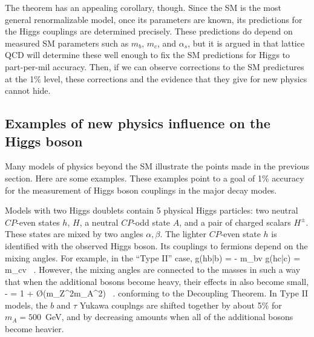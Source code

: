 The theorem has an appealing corollary, though.   Since the SM is the most general renormalizable model, once its parameters are known, its predictions for the Higgs couplings are determined precisely.   These predictions do depend on measured SM parameters such as $m_b$, $m_c$, and $\alpha_s$, but  it is argued in \cite{Lepage:2014fla} that  
lattice QCD will determine these well enough to fix the SM predictions for Higgs to part-per-mil accuracy.   Then, if we can observe corrections to the SM predictures at the 1\% level, these corrections and the evidence that they give for new physics cannot hide.

\subsection{Examples of  new physics influence on the Higgs boson}

Many models of physics beyond the SM illustrate the points made in the previous section. Here are some examples.   These examples point to  a goal of 1\% accuracy
for the measurement of Higgs boson couplings in the major decay modes.

Models with two Higgs doublets contain 5 physical Higgs particles: two  neutral $CP$-even states $h$, $H$,  a neutral $CP$-odd state $A$, and a pair of charged scalars $H^\pm$.  These states are mixed by two angles $\alpha, \beta$. The lighter
$CP$-even state $h$ is identified with the observed Higgs boson.  Its couplings to 
fermions depend on the mixing angles.   For example, in the ``Type II'' case, 
\beq
   g(hb\bar b) = - {\sin\alpha\over \cos\beta}{m_b\over v}  \quad   g(hc\bar c) =  {\cos\alpha\over \sin\beta}{m_c\over v}   \ .
However, the mixing angles are connected to the masses in such a way that when the additional bosons become heavy, their effects in  also become small,
\beq
     - {\sin\alpha\over \cos\beta} =  1 + \O({m_Z^2\over m_A^2}) \ .
\eeqn
conforming to the Decoupling Theorem.   In Type II models, the $b$ and $\tau$ Yukawa couplngs are shifted together by about 5\% for $m_A = 500$~GeV, and by decreasing amounts when all of the additional bosons become heavier.

